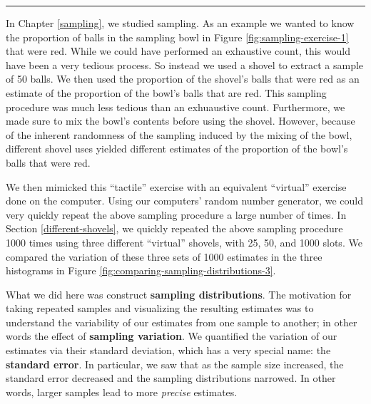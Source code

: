 \documentclass[12pt, krantz2,]{krantz}
\begin{document}
\begin{center}\rule{0.5\linewidth}{\linethickness}\end{center}

In Chapter \ref{sampling}, we studied sampling. As an example we wanted to know the proportion of balls in the sampling bowl in Figure \ref{fig:sampling-exercise-1} that were red. While we could have performed an exhaustive count, this would have been a very tedious process. So instead we used a shovel to extract a sample of 50 balls. We then used the proportion of the shovel's balls that were red as an estimate of the proportion of the bowl's balls that are red. This sampling procedure was much less tedious than an exhuaustive count. Furthermore, we made sure to mix the bowl's contents before using the shovel. However, because of the inherent randomness of the sampling induced by the mixing of the bowl, different shovel uses yielded different estimates of the proportion of the bowl's balls that were red.

We then mimicked this ``tactile'' exercise with an equivalent ``virtual'' exercise done on the computer. Using our computers' random number generator, we could very quickly repeat the above sampling procedure a large number of times. In Section \ref{different-shovels}, we quickly repeated the above sampling procedure 1000 times using three different ``virtual'' shovels, with 25, 50, and 1000 slots. We compared the variation of these three sets of 1000 estimates in the three histograms in Figure \ref{fig:comparing-sampling-distributions-3}.

What we did here was construct \textbf{sampling distributions}. The motivation for taking repeated samples and visualizing the resulting estimates was to understand the variability of our estimates from one sample to another; in other words the effect of \textbf{sampling variation}. We quantified the variation of our estimates via their standard deviation, which has a very special name: the \textbf{standard error}. In particular, we saw that as the sample size increased, the standard error decreased and the sampling distributions narrowed. In other words, larger samples lead to more \emph{precise} estimates.
\end{document}
